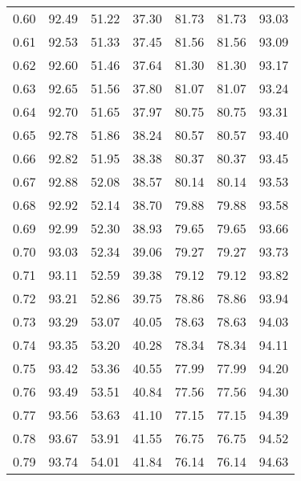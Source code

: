 \begin{tabular}{|c|c|c|c|c|c|c|}
      0.60 &     92.49 &     51.22 &      37.30 &   81.73 &      81.73 &         93.03 \\
      0.61 &     92.53 &     51.33 &      37.45 &   81.56 &      81.56 &         93.09 \\
      0.62 &     92.60 &     51.46 &      37.64 &   81.30 &      81.30 &         93.17 \\
      0.63 &     92.65 &     51.56 &      37.80 &   81.07 &      81.07 &         93.24 \\
      0.64 &     92.70 &     51.65 &      37.97 &   80.75 &      80.75 &         93.31 \\
      0.65 &     92.78 &     51.86 &      38.24 &   80.57 &      80.57 &         93.40 \\
      0.66 &     92.82 &     51.95 &      38.38 &   80.37 &      80.37 &         93.45 \\
      0.67 &     92.88 &     52.08 &      38.57 &   80.14 &      80.14 &         93.53 \\
      0.68 &     92.92 &     52.14 &      38.70 &   79.88 &      79.88 &         93.58 \\
      0.69 &     92.99 &     52.30 &      38.93 &   79.65 &      79.65 &         93.66 \\
      0.70 &     93.03 &     52.34 &      39.06 &   79.27 &      79.27 &         93.73 \\
      0.71 &     93.11 &     52.59 &      39.38 &   79.12 &      79.12 &         93.82 \\
      0.72 &     93.21 &     52.86 &      39.75 &   78.86 &      78.86 &         93.94 \\
      0.73 &     93.29 &     53.07 &      40.05 &   78.63 &      78.63 &         94.03 \\
      0.74 &     93.35 &     53.20 &      40.28 &   78.34 &      78.34 &         94.11 \\
      0.75 &     93.42 &     53.36 &      40.55 &   77.99 &      77.99 &         94.20 \\
      0.76 &     93.49 &     53.51 &      40.84 &   77.56 &      77.56 &         94.30 \\
      0.77 &     93.56 &     53.63 &      41.10 &   77.15 &      77.15 &         94.39 \\
      0.78 &     93.67 &     53.91 &      41.55 &   76.75 &      76.75 &         94.52 \\
      0.79 &     93.74 &     54.01 &      41.84 &   76.14 &      76.14 &         94.63 \\

\end{tabular}
